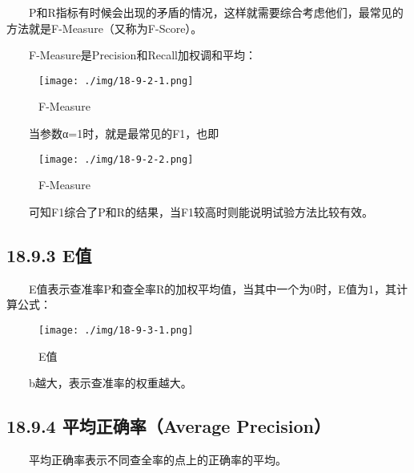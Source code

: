   P和R指标有时候会出现的矛盾的情况，这样就需要综合考虑他们，最常见的方法就是F-Measure（又称为F-Score）。

  F-Measure是Precision和Recall加权调和平均：

\begin{figure}
\centering
\texttt{[image: ./img/18-9-2-1.png]}
\caption{F-Measure}
\end{figure}

  当参数α=1时，就是最常见的F1，也即

\begin{figure}
\centering
\texttt{[image: ./img/18-9-2-2.png]}
\caption{F-Measure}
\end{figure}

  可知F1综合了P和R的结果，当F1较高时则能说明试验方法比较有效。

\subsection{18.9.3 E值}\label{eux503c}

  E值表示查准率P和查全率R的加权平均值，当其中一个为0时，E值为1，其计算公式：

\begin{figure}
\centering
\texttt{[image: ./img/18-9-3-1.png]}
\caption{E值}
\end{figure}

  b越大，表示查准率的权重越大。

\subsection{18.9.4 平均正确率（Average
Precision）}\label{ux5e73ux5747ux6b63ux786eux7387average-precision}

  平均正确率表示不同查全率的点上的正确率的平均。













